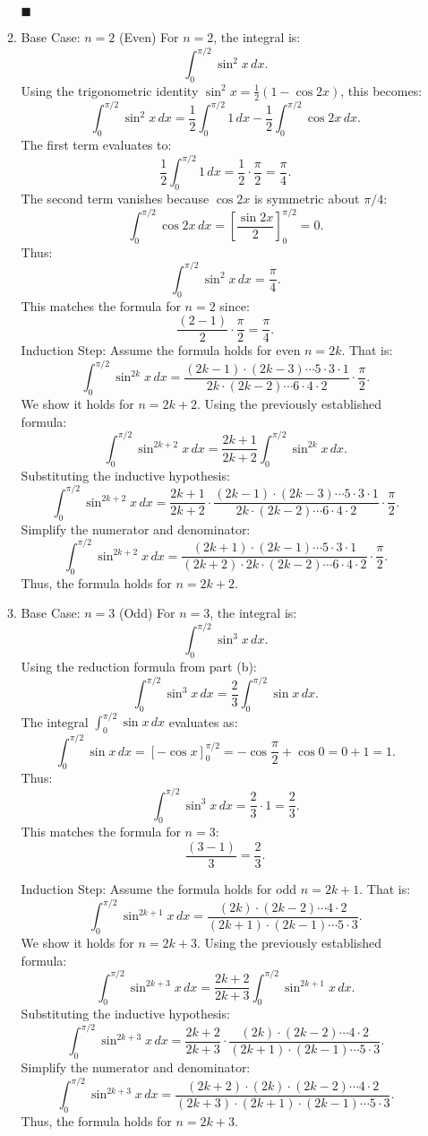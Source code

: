 \documentclass[12pt]{article}
\begin{document}
\begin{enumerate}
\begin{enumerate}
    $\blacksquare$
    \item Base Case: \(n = 2\) (Even)
For \(n = 2\), the integral is:
\[
\int_0^{\pi/2} \sin^2 x \, dx.
\]
Using the trigonometric identity \(\sin^2 x = \frac{1}{2}(1 - \cos 2x)\), this becomes:
\[
\int_0^{\pi/2} \sin^2 x \, dx = \frac{1}{2} \int_0^{\pi/2} 1 \, dx - \frac{1}{2} \int_0^{\pi/2} \cos 2x \, dx.
\]
The first term evaluates to:
\[
\frac{1}{2} \int_0^{\pi/2} 1 \, dx = \frac{1}{2} \cdot \frac{\pi}{2} = \frac{\pi}{4}.
\]
The second term vanishes because \(\cos 2x\) is symmetric about \(\pi/4\):
\[
\int_0^{\pi/2} \cos 2x \, dx = \left[ \frac{\sin 2x}{2} \right]_0^{\pi/2} = 0.
\]
Thus:
\[
\int_0^{\pi/2} \sin^2 x \, dx = \frac{\pi}{4}.
\]
This matches the formula for \(n = 2\) since:
\[
\frac{(2-1)}{2} \cdot \frac{\pi}{2} = \frac{\pi}{4}.
\]
Induction Step: 
Assume the formula holds for even \(n = 2k\). That is:
\[
\int_0^{\pi/2} \sin^{2k} x \, dx = \frac{(2k-1) \cdot (2k-3) \cdots 5 \cdot 3 \cdot 1}{2k \cdot (2k-2) \cdots 6 \cdot 4 \cdot 2} \cdot \frac{\pi}{2}.
\]
We show it holds for \(n = 2k+2\). Using the previously established formula:
\[
\int_0^{\pi/2} \sin^{2k+2} x \, dx = \frac{2k+1}{2k+2} \int_0^{\pi/2} \sin^{2k} x \, dx.
\]
Substituting the inductive hypothesis:
\[
\int_0^{\pi/2} \sin^{2k+2} x \, dx = \frac{2k+1}{2k+2} \cdot \frac{(2k-1) \cdot (2k-3) \cdots 5 \cdot 3 \cdot 1}{2k \cdot (2k-2) \cdots 6 \cdot 4 \cdot 2} \cdot \frac{\pi}{2}.
\]
Simplify the numerator and denominator:
\[
\int_0^{\pi/2} \sin^{2k+2} x \, dx = \frac{(2k+1) \cdot (2k-1) \cdots 5 \cdot 3 \cdot 1}{(2k+2) \cdot 2k \cdot (2k-2) \cdots 6 \cdot 4 \cdot 2} \cdot \frac{\pi}{2}.
\]
Thus, the formula holds for \(n = 2k+2\).

\item 
Base Case: \(n = 3\) (Odd)
For \(n = 3\), the integral is:
\[
\int_0^{\pi/2} \sin^3 x \, dx.
\]
Using the reduction formula from part (b):
\[
\int_0^{\pi/2} \sin^3 x \, dx = \frac{2}{3} \int_0^{\pi/2} \sin x \, dx.
\]
The integral \(\int_0^{\pi/2} \sin x \, dx\) evaluates as:
\[
\int_0^{\pi/2} \sin x \, dx = \left[-\cos x \right]_0^{\pi/2} = -\cos \frac{\pi}{2} + \cos 0 = 0 + 1 = 1.
\]
Thus:
\[
\int_0^{\pi/2} \sin^3 x \, dx = \frac{2}{3} \cdot 1 = \frac{2}{3}.
\]
This matches the formula for \(n = 3\):
\[
\frac{(3-1)}{3} = \frac{2}{3}.
\]


Induction Step: 
Assume the formula holds for odd \(n = 2k+1\). That is:
\[
\int_0^{\pi/2} \sin^{2k+1} x \, dx = \frac{(2k) \cdot (2k-2) \cdots 4 \cdot 2}{(2k+1) \cdot (2k-1) \cdots 5 \cdot 3}.
\]
We show it holds for \(n = 2k+3\). Using the previously established formula:
\[
\int_0^{\pi/2} \sin^{2k+3} x \, dx = \frac{2k+2}{2k+3} \int_0^{\pi/2} \sin^{2k+1} x \, dx.
\]
Substituting the inductive hypothesis:
\[
\int_0^{\pi/2} \sin^{2k+3} x \, dx = \frac{2k+2}{2k+3} \cdot \frac{(2k) \cdot (2k-2) \cdots 4 \cdot 2}{(2k+1) \cdot (2k-1) \cdots 5 \cdot 3}.
\]
Simplify the numerator and denominator:
\[
\int_0^{\pi/2} \sin^{2k+3} x \, dx = \frac{(2k+2) \cdot (2k) \cdot (2k-2) \cdots 4 \cdot 2}{(2k+3) \cdot (2k+1) \cdot (2k-1) \cdots 5 \cdot 3}.
\]
Thus, the formula holds for \(n = 2k+3\).
\end{enumerate}


\end{enumerate}
\end{document}
